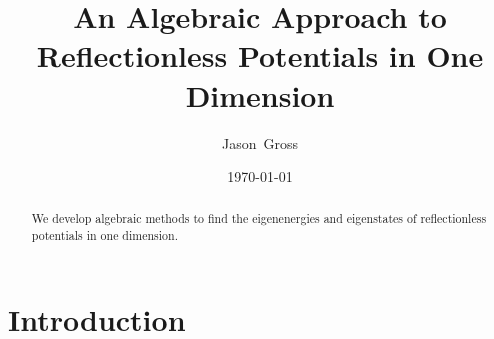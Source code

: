 \documentclass[aps,prd,final,twocolumn,10pt]{revtex4}
\begin{document}
\title{An Algebraic Approach to Reflectionless Potentials in One Dimension}
\author{Jason~Gross}

\makeatletter
{}
\edef\domarkboth{\noexpand\markboth{\@author}{\@title}}
\makeatother

\date{\today} 


\begin{abstract}
\noindent	
We develop algebraic methods to find the eigenenergies and 
	eigenstates of reflectionless potentials in one dimension.  
\end{abstract}

\maketitle
\pagestyle{myheadings}
\domarkboth
\thispagestyle{empty}


\section{Introduction}



 


\nocite{*}

\end{document}
